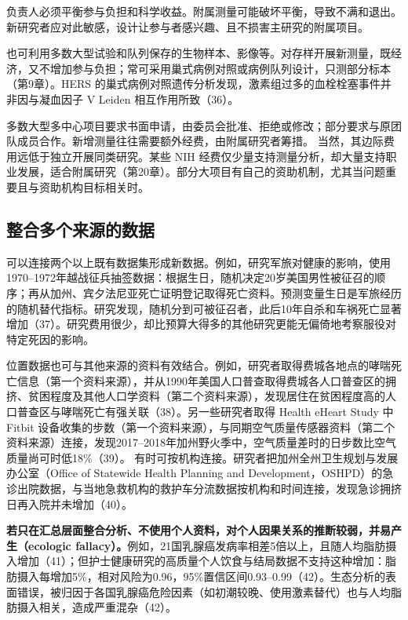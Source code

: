 负责人必须平衡参与负担和科学收益。附属测量可能破坏平衡，导致不满和退出。新研究者应对此敏感，设计让参与者感兴趣、且不损害主研究的附属项目。

也可利用多数大型试验和队列保存的生物样本、影像等。对存样开展新测量，既经济，又不增加参与负担；常可采用巢式病例对照或病例队列设计，只测部分标本（第9章）。HERS 的巢式病例对照遗传分析发现，激素组过多的血栓栓塞事件并非因与凝血因子 V Leiden 相互作用所致（36）。

多数大型多中心项目要求书面申请，由委员会批准、拒绝或修改；部分要求与原团队成员合作。新增测量往往需要额外经费，由附属研究者筹措。
当然，其边际费用远低于独立开展同类研究。某些 NIH 经费仅少量支持测量分析，却大量支持职业发展，适合附属研究（第20章）。部分大项目有自己的资助机制，尤其当问题重要且与资助机构目标相关时。

\subsection{整合多个来源的数据}
可以连接两个以上既有数据集形成新数据。例如，研究军旅对健康的影响，使用1970--1972年越战征兵抽签数据：根据生日，随机决定20岁美国男性被征召的顺序；再从加州、宾夕法尼亚死亡证明登记取得死亡资料。预测变量生日是军旅经历的随机替代指标。研究发现，随机分到可被征召者，此后10年自杀和车祸死亡显著增加（37）。研究费用很少，却比预算大得多的其他研究更能无偏倚地考察服役对特定死因的影响。

位置数据也可与其他来源的资料有效结合。例如，研究者取得费城各地点的哮喘死亡信息（第一个资料来源），并从1990年美国人口普查取得费城各人口普查区的拥挤、贫困程度及其他人口学资料（第二个资料来源），发现居住在贫困程度高的人口普查区与哮喘死亡有强关联（38）。另一些研究者取得 Health eHeart Study 中 Fitbit 设备收集的步数（第一个资料来源），与同期空气质量传感器资料（第二个资料来源）连接，发现2017--2018年加州野火季中，空气质量差时的日步数比空气质量尚可时低18\%（39）。
有时可按机构连接。研究者把加州全州卫生规划与发展办公室（Office of Statewide Health Planning and Development，OSHPD）的急诊出院数据，与当地急救机构的救护车分流数据按机构和时间连接，发现急诊拥挤日再入院并未增加（40）。

\textbf{若只在汇总层面整合分析、不使用个人资料，对个人因果关系的推断较弱，并易产生（ecologic fallacy）。}例如，21国乳腺癌发病率相差5倍以上，且随人均脂肪摄入增加（41）；但护士健康研究的高质量个人饮食与结局数据不支持这种增加：脂肪摄入每增加5\%，相对风险为0.96，95\%置信区间0.93--0.99（42）。生态分析的表面错误，被归因于各国乳腺癌危险因素（如初潮较晚、使用激素替代）也与人均脂肪摄入相关，造成严重混杂（42）。

